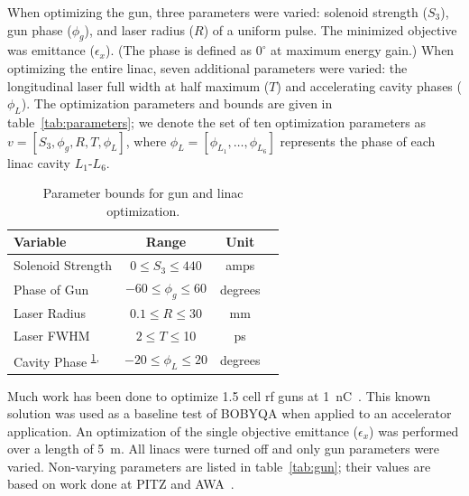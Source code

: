 When optimizing the gun, three parameters were varied: 
solenoid strength ($S_3$), gun phase ($\phi_g$), 
and laser radius ($R$) of a uniform pulse. 
The minimized objective was emittance ($\epsilon_x$).
(The phase is defined as $0^{\circ}$ at maximum energy gain.) 
When optimizing the entire linac, seven additional parameters were 
varied: the longitudinal laser full width at half maximum ($T$)
and accelerating cavity phases ($\phi_L$). The optimization parameters and
bounds are given in table~\ref{tab:parameters}; we denote the set of
ten optimization parameters as $v=[S_3, \phi_g, R, T, \phi_L]$, where 
$\phi_L=[\phi_{L_1},\ldots,\phi_{L_6}]$ represents the phase of each linac cavity $L_1$-$L_6$. 
\begin{table}
	\caption{\label{tab:parameters} Parameter bounds for gun and linac optimization.}
	\begin{center}
		\begin{tabular}{ l *{3}{c}} 
			\toprule
			\textbf{Variable} & \textbf{Range} & \textbf{Unit} \\
			\midrule
			Solenoid Strength & $ 0 \le S_3 \le 440$  & amps \\
			Phase of Gun & $-60 \le \phi_g \le 60$  & degrees \\
			Laser Radius  & $0.1 \le R \le 30$  & mm \\
			Laser FWHM \footnotemark \label{note1}& $2 \le T \le $10  & ps \\
			Cavity Phase \textsuperscript{\ref{note1},}\footnotemark & $-20 \le \phi_L \le 20$  & degrees \\
			\bottomrule	
		\end{tabular}
	\addtocounter{footnote}{-1}
	\addtocounter{footnote}{+1}
	\end{center}
\end{table}


 \label{sec:gunbobyqa}
Much work has been done to optimize 1.5 cell rf guns
at \SI{1}{nC}~\cite{pitz}. This known solution was used as 
a baseline test of BOBYQA when applied to an accelerator application.
An optimization of the single objective emittance ($\epsilon_x$) was 
performed over a length of \SI{5}{m}. 
All linacs were turned off and only gun parameters were varied. 
Non-varying parameters are listed in table~\ref{tab:gun}; 
their values are based on work done at PITZ and AWA~\cite{pitz, benchmark}.

